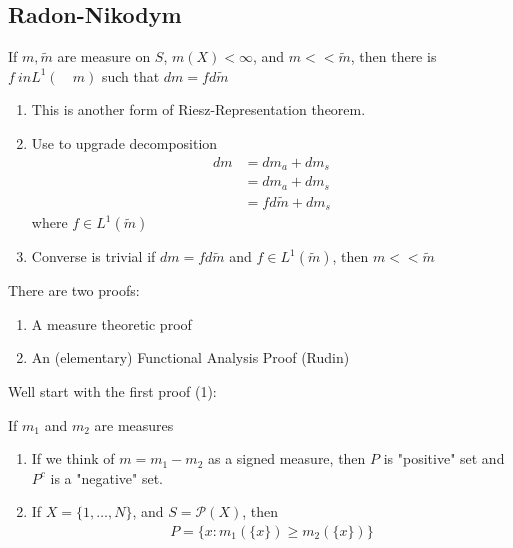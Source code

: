\subsection{Radon-Nikodym}

\begin{theorem}
	If $m, \tilde{m}$ are measure on $S$, $m(X) < \infty$, and $m << \tilde{m}$, then there is $f \ in L^{1} ( \quad{m})$ such that
	$dm = f d\tilde{m}$
\end{theorem}

\begin{remark}
	\begin{enumerate}
		\item This is another form of Riesz-Representation theorem.
		\item Use to upgrade decomposition
			\begin{align*}
				dm &= dm_{a} + dm_s \\
				   &= dm_a + dm_s \\
				   &= f d\tilde{m} + d m_{s}
			\end{align*} where $f \in L^{1} (\tilde m)$
		\item Converse is trivial if $dm = f d \tilde{m}$ and
			$f \in L^1 (\tilde{m} )$, then $m << \tilde{m}$
	\end{enumerate}
\end{remark}

There are two proofs:
\begin{enumerate}
	\item A measure theoretic proof
	\item An (elementary) Functional Analysis Proof (Rudin)
\end{enumerate}

Well start with the first proof (1):

\begin{theorem} If $m_1$ and $m_2$ are measures
\end{theorem}


\begin{remark}
	\begin{enumerate}
		\item If we think of $m = m_1 - m_2$ as a signed measure, then $P$ is "positive" set and $P^c$ is a "negative" set.
		\item If $X = \{1, \ldots, N\}$, and $S = \mathcal{P} (X)$, then
			\begin{align*}
				P = \{x : m_{1} (\{x\}) \geq m_2 (\{ x \})\}
			\end{align*} 
	\end{enumerate}
\end{remark}

